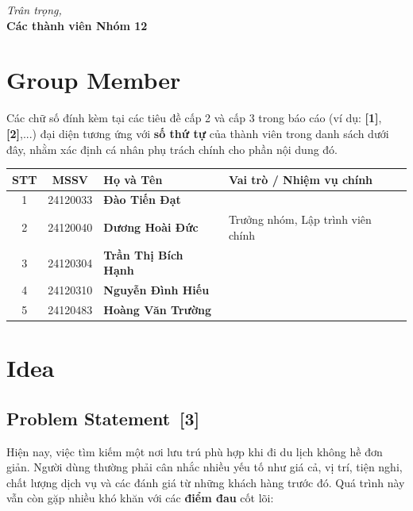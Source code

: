\documentclass[12pt, a4paper]{article}
\begin{document}
\vspace{1.5cm}
\begin{flushright}
  \textit{Trân trọng,}\\
  \textbf{Các thành viên Nhóm 12}
\end{flushright}


\newpage
\renewcommand{\contentsname}{Table of Contents}
\tableofcontents

\newpage
\section{Group Member}

\begin{tcolorbox}[
    colback=blue!5!white,
    colframe=blue!75!black,
    title={\faInfoCircle\hspace{0.5em}Ghi chú},
    fonttitle=\bfseries,
    boxrule=1pt,
    arc=4pt,
    left=6pt, right=6pt, top=4pt, bottom=4pt
]
Các chữ số đính kèm tại các tiêu đề cấp 2 và cấp 3 trong báo cáo (ví dụ: \textbf{[1]}, \textbf{[2]},...) đại diện tương ứng với \textbf{số thứ tự} của thành viên trong danh sách dưới đây, nhằm xác định cá nhân phụ trách chính cho phần nội dung đó.
\end{tcolorbox}

\vspace{0.5cm}
\renewcommand{\arraystretch}{1.8}
\begin{table}[h!]
  \centering
  \begin{tabularx}{\textwidth}{@{} c c X X @{}}
    \toprule
    \textbf{STT} & \textbf{MSSV} & \textbf{Họ và Tên} & \textbf{Vai trò / Nhiệm vụ chính} \\
    \midrule
    1 & 24120033 & \textbf{Đào Tiến Đạt} & \\
    2 & 24120040 & \textbf{Dương Hoài Đức} & Trưởng nhóm, Lập trình viên chính \\
    3 & 24120304 & \textbf{Trần Thị Bích Hạnh} & \\
    4 & 24120310 & \textbf{Nguyễn Đình Hiếu} & \\
    5 & 24120483 & \textbf{Hoàng Văn Trường} & \\
    \bottomrule
  \end{tabularx}
\end{table}


\newpage
\section{Idea}

\subsection[Problem Statement]{Problem Statement \,{\normalfont\small\textcolor{cyan!70!black}{[3]}}}
Hiện nay, việc tìm kiếm một nơi lưu trú phù hợp khi đi du lịch không hề đơn giản. Người dùng thường phải cân nhắc nhiều yếu tố như giá cả, vị trí, tiện nghi, chất lượng dịch vụ và các đánh giá từ những khách hàng trước đó. Quá trình này vẫn còn gặp nhiều khó khăn với các \textbf{điểm đau} cốt lõi:
\end{document}
